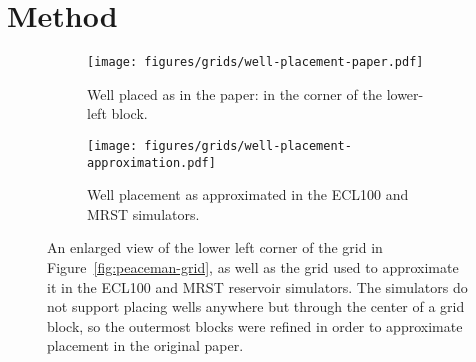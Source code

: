 
\section{Method} %
\label{sec:method}

\begin{figure}[H]
    \centering
    \begin{subfigure}[c]{0.45\textwidth}
            \texttt{[image: figures/grids/well-placement-paper.pdf]}
            \caption{Well placed as in the paper: in the corner of the lower-left block.}
            \label{fig:well-placement-paper}
    \end{subfigure}%
    \quad
    \begin{subfigure}[c]{0.45\textwidth}
            \texttt{[image: figures/grids/well-placement-approximation.pdf]}
            \caption{Well placement as approximated in the ECL100 and MRST simulators.}
            \label{fig:well-placement-simulator}
    \end{subfigure}
    \caption{An enlarged view of the lower left corner of the grid in Figure~\ref{fig:peaceman-grid}, as well as the grid used to approximate it in the ECL100 and MRST reservoir simulators. The simulators do not support placing wells anywhere but through the center of a grid block, so the outermost blocks were refined in order to approximate placement in the original paper.}
\end{figure}

